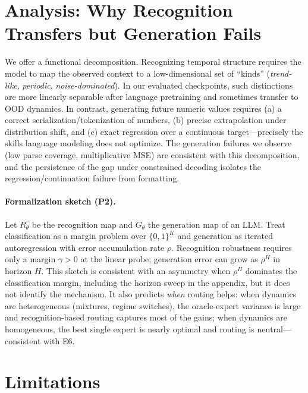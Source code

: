 \documentclass{article}
\begin{document}


\section{Analysis: Why Recognition Transfers but Generation Fails}\label{sec:analysis}

We offer a functional decomposition.  Recognizing temporal structure requires
the model to map the observed context to a low-dimensional set of ``kinds''
(\emph{trend-like}, \emph{periodic}, \emph{noise-dominated}).  In our evaluated
checkpoints, such distinctions are more linearly separable after language
pretraining and sometimes transfer to OOD dynamics.  In contrast, generating
future numeric values requires (a) a correct serialization/tokenization of
numbers, (b) precise extrapolation under distribution shift, and (c) exact
regression over a continuous target---precisely the skills language modeling
does not optimize.  The generation failures we observe (low parse coverage,
multiplicative MSE) are consistent with this decomposition, and the persistence
of the gap under constrained decoding isolates the regression/continuation
failure from formatting.

\paragraph{Formalization sketch (P2).}  Let $R_\theta$ be the recognition map
and $G_\theta$ the generation map of an LLM.  Treat classification as a
margin problem over $\{0,1\}^K$ and generation as iterated autoregression with
error accumulation rate $\rho$.  Recognition robustness requires only a margin
$\gamma>0$ at the linear probe; generation error can grow as $\rho^H$ in
horizon $H$.  This sketch is consistent with an asymmetry when $\rho^H$
dominates the classification margin, including the horizon sweep in the
appendix, but it does not identify the mechanism.  It also predicts \emph{when}
routing helps: when dynamics are heterogeneous (mixtures, regime switches), the
oracle-expert variance is large and recognition-based routing captures most of
the gains; when dynamics are homogeneous, the best single expert is nearly
optimal and routing is neutral---consistent with E6.

\section{Limitations}\label{sec:limits}
\end{document}
